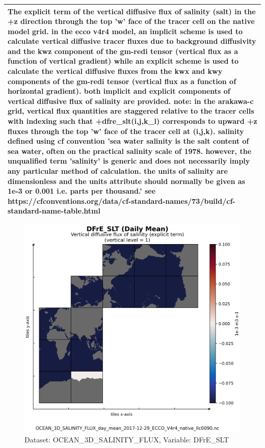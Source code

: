 \begin{longtable}{|m{}|m{}|m{}|m{}|}
\multicolumn{4}{|p{1\textwidth}|}{\footnotesize{{The explicit term of the vertical diffusive flux of salinity (salt) in the +z direction through the top 'w' face of the tracer cell on the native model grid. in the ecco v4r4 model, an implicit scheme is used to calculate vertical diffusive tracer fluxes due to background diffusivity and the kwz component of the gm-redi tensor (vertical flux as a function of vertical gradient) while an explicit scheme is used to calculate the vertical diffusive fluxes from the kwx and kwy components of the gm-redi tensor (vertical flux as a function of horizontal gradient). both implicit and explicit components of vertical diffusive flux of salinity are provided. note: in the arakawa-c grid, vertical flux quantities are staggered relative to the tracer cells with indexing such that +dfre\_slt(i,j,k\_l) corresponds to upward +z fluxes through the top 'w' face of the tracer cell at (i,j,k). salinity defined using cf convention 'sea water salinity is the salt content of sea water, often on the practical salinity scale of 1978. however, the unqualified term 'salinity' is generic and does not necessarily imply any particular method of calculation. the units of salinity are dimensionless and the units attribute should normally be given as 1e-3 or 0.001 i.e. parts per thousand.' see https://cfconventions.org/data/cf-standard-names/73/build/cf-standard-name-table.html}}} \\ \hline
\end{longtable}

\begin{figure}[H]
\centering
\includegraphics[scale=0.55]{../images/plots/native_plots/Ocean_Three-Dimensional_Salinity_Fluxes/DFrE_SLT.png}
\caption{Dataset: OCEAN\_3D\_SALINITY\_FLUX, Variable: DFrE\_SLT}
\label{tab:table-OCEAN_3D_SALINITY_FLUX_DFrE_SLT-Plot}
\end{figure}
\newpage
\pagebreak
